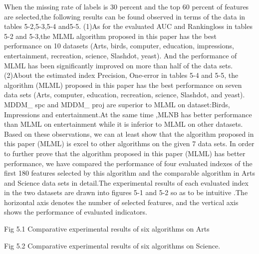 \documentclass[final,3p,times]{elsarticle}
\begin{document}
When the missing rate of labels is 30 percent and the top 60 percent of features are selected,the following results can be found observed in terms of the data in tables 5-2,5-3,5-4 and5-5.
(1)As for the evaluated AUC and Rankingloss in tables 5-2 and 5-3,the MLML algorithm proposed in this paper has the best performance on 10 datasets (Arts, birds, computer, education, impressions, entertainment, recreation, science, Slashdot, yeast). And the performance of MLML has been significantly improved on more than half of the data sets.
(2)About the estimated index Precision, One-error in tables 5-4 and 5-5, the algorithm (MLML) proposed in this paper has the best performance on seven data sets (Arts, computer, education, recreation, science, Slashdot, and yeast). MDDM_ spc and MDDM_ proj are superior to MLML on dataset:Birds, Impressions and entertainment.At the same time ,MLNB has better performance than MLML on entertainment while it is inferior to MLML on other datasets.
Based on these observations, we can at least show that the algorithm proposed in this paper (MLML) is excel to other algorithms on the given 7 data sets.
In order to further prove that the algorithm proposed in this paper (MLML) has better performance, we have compared the performance of four evaluated indexes of the first 180 features selected by this algorithm and the comparable algorithm in Arts and Science data sets in detail.The experimental results of each evaluated index in the two datasets are drawn into figures 5-1 and 5-2 so as to be intuitive .The horizontal axis denotes the number of selected features, and the vertical axis shows the performance of evaluated indicators.
Fig 5.1 Comparative experimental results of six algorithms on Arts   
Fig 5.2 Comparative experimental results of six algorithms on Science.
\end{document}
